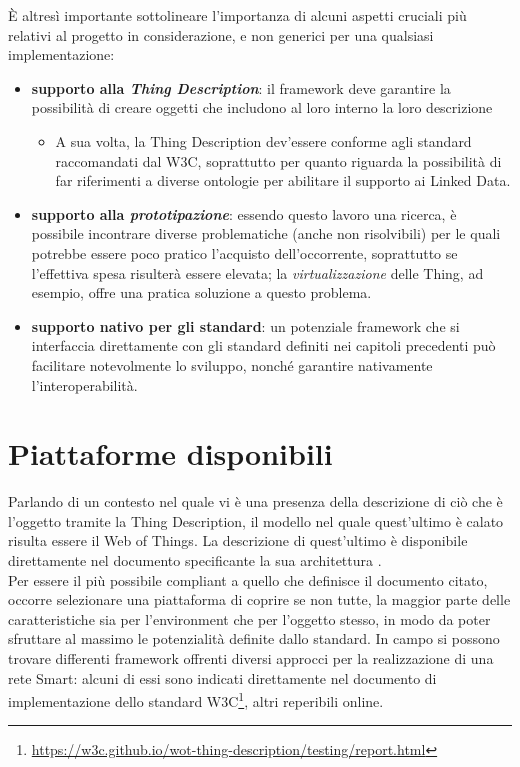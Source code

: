 \documentclass[12pt,a4paper,openright,oneside]{report}
\begin{document}
È altresì importante sottolineare l'importanza di alcuni aspetti cruciali più relativi al progetto in considerazione, e non generici per una qualsiasi implementazione:

\begin{itemize}
	\setlength\itemsep{0em}
	\item \textbf{supporto alla \textit{Thing Description}}: il framework deve garantire la possibilità di creare oggetti che includono al loro interno la loro descrizione
	\begin{itemize}
		\setlength\itemsep{0em}
		\item A sua volta, la Thing Description dev'essere conforme agli standard raccomandati dal W3C, soprattutto per quanto riguarda la possibilità di far riferimenti a diverse ontologie per abilitare il supporto ai Linked Data.
	\end{itemize}

	\item \textbf{supporto alla \textit{prototipazione}}: essendo questo lavoro una ricerca, è possibile incontrare diverse problematiche (anche non risolvibili) per le quali potrebbe essere poco pratico l'acquisto dell'occorrente, soprattutto se l'effettiva spesa risulterà essere elevata; la \textit{virtualizzazione} delle Thing, ad esempio, offre una pratica soluzione a questo problema.
	
	\item \textbf{supporto nativo per gli standard}: un potenziale framework che si interfaccia direttamente con gli standard definiti nei capitoli precedenti può facilitare notevolmente lo sviluppo, nonché garantire nativamente l'interoperabilità.
\end{itemize}

\section{Piattaforme disponibili}
Parlando di un contesto nel quale vi è una presenza della descrizione di ciò che è l'oggetto tramite la Thing Description, il modello nel quale quest'ultimo è calato risulta essere il Web of Things. La descrizione di quest'ultimo è disponibile direttamente nel documento specificante la sua architettura \cite{wot}.\\

Per essere il più possibile compliant a quello che definisce il documento citato, occorre selezionare una piattaforma di coprire se non tutte, la maggior parte delle caratteristiche sia per l'environment che per l'oggetto stesso, in modo da poter sfruttare al massimo le potenzialità definite dallo standard. In campo si possono trovare differenti framework offrenti diversi approcci per la realizzazione di una rete Smart: alcuni di essi sono indicati direttamente nel documento di implementazione dello standard W3C\footnote{\url{https://w3c.github.io/wot-thing-description/testing/report.html}}, altri reperibili online.
\end{document}
